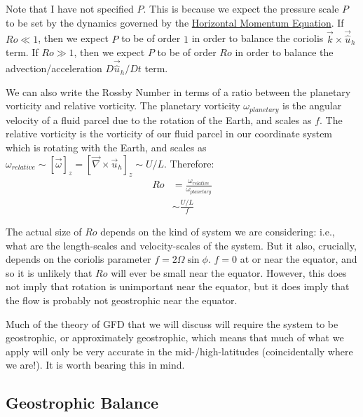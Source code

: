 Note that I have not specified $P$. This is because we expect the pressure scale $P$ to be set by the dynamics governed by the \hyperref[Horizontal Approximate]{Horizontal Momentum Equation}. If $Ro\ll 1$, then we expect $P$ to be of order $1$ in order to balance the coriolis $\vec{k}\times\vec{\hat{u}}_h$ term. If $Ro\gg 1$, then we expect $P$ to be of order $Ro$ in order to balance the advection/acceleration $D\vec{\hat{u}}_h/Dt$ term. 

We can also write the Rossby Number in terms of a ratio between the planetary vorticity and relative vorticity. The planetary vorticity $\omega_{planetary}$ is the angular velocity of a fluid parcel due to the rotation of the Earth, and scales as $f$. The relative vorticity is the vorticity of our fluid parcel in our coordinate system which is rotating with the Earth, and scales as $\omega_{relative}\sim[\vec{\omega}]_z=[\vec{\nabla}\times\vec{u}_h]_z\sim U/L$. Therefore:
\begin{align}
    Ro &= \frac{\omega_{relative}}{\omega_{planetary}}\\
    &\sim\frac{U/L}{f}
\end{align}

The actual size of $Ro$ depends on the kind of system we are considering: i.e., what are the length-scales and velocity-scales of the system. But it also, crucially, depends on the coriolis parameter $f=2\Omega\sin\phi$. $f=0$ at or near the equator, and so it is unlikely that $Ro$ will ever be small near the equator. However, this does not imply that rotation is unimportant near the equator, but it does imply that the flow is probably not geostrophic near the equator.

Much of the theory of GFD that we will discuss will require the system to be geostrophic, or approximately geostrophic, which means that much of what we apply will only be very accurate in the mid-/high-latitudes (coincidentally where we are!). It is worth bearing this in mind.

\subsection{Geostrophic Balance}

